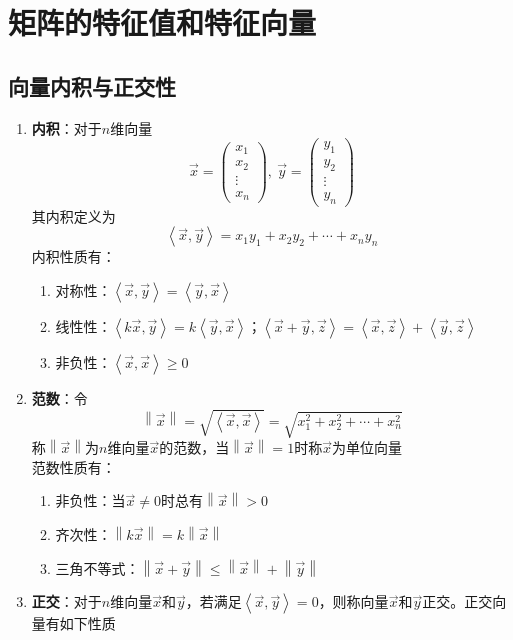 \documentclass[12pt,a4paper,UTF8]{book}
\begin{document}
\section{矩阵的特征值和特征向量}
\subsection{向量内积与正交性}
\begin{enumerate}
\item \textbf{内积}：对于$n$维向量
\[\vec{x}=\begin{pmatrix}x_1\\x_2\\\vdots\\x_n\end{pmatrix},\ \vec{y}=\begin{pmatrix}y_1\\y_2\\\vdots\\y_n\end{pmatrix}\]
其内积定义为
\[\left<\vec{x},\vec{y}\right>=x_1y_1+x_2y_2+\cdots+x_ny_n\]
内积性质有：
\begin{enumerate}
\item 对称性：$\left<\vec{x},\vec{y}\right>=\left<\vec{y},\vec{x}\right>$
\item 线性性：$\left<k\vec{x},\vec{y}\right>=k\left<\vec{y},\vec{x}\right>$；$\left<\vec{x}+\vec{y},\vec{z}\right>=\left<\vec{x},\vec{z}\right>+\left<\vec{y},\vec{z}\right>$
\item 非负性：$\left<\vec{x},\vec{x}\right>\geq0$
\end{enumerate}
\item \textbf{范数}：令
\[\left\|\vec{x}\right\|=\sqrt{\left<\vec{x},\vec{x}\right>}=\sqrt{x_1^2+x_2^2+\cdots+x_n^2}\]
称$\left\|\vec{x}\right\|$为$n$维向量$\vec{x}$的范数，当$\left\|\vec{x}\right\|=1$时称$\vec{x}$为单位向量\\
范数性质有：
\begin{enumerate}
\item 非负性：当$\vec{x}\neq0$时总有$\left\|\vec{x}\right\|>0$
\item 齐次性：$\left\|k\vec{x}\right\|=k\left\|\vec{x}\right\|$
\item 三角不等式：$\left\|\vec{x}+\vec{y}\right\|\leq\left\|\vec{x}\right\|+\left\|\vec{y}\right\|$
\end{enumerate}
\item \textbf{正交}：对于$n$维向量$\vec{x}$和$\vec{y}$，若满足$\left<\vec{x},\vec{y}\right>=0$，则称向量$\vec{x}$和$\vec{y}$正交。正交向量有如下性质

\end{enumerate}
\end{document}
